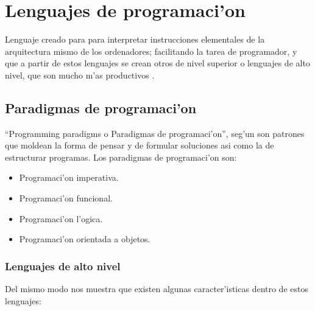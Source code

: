 

\section{Lenguajes de programaci'on}
 
 
Lenguaje creado para para interpretar instrucciones elementales de la arquitectura mismo de los ordenadores; facilitando la tarea de programador, y que a partir de estos lenguajes se crean otros de nivel superior o lenguajes de alto nivel, que son mucho m'as productivos \citep{javier}.

 
\subsection{Paradigmas de programaci'on}

``Programming paradigms o Paradigmas de programaci'on'', seg'un \citet{javier} son patrones que moldean la forma de pensar y de formular soluciones asi como la de estructurar programas. Los paradigmas de programaci'on son: 
\begin{itemize}
\item Programaci'on imperativa. 
\item Programaci'on funcional. 
\item Programaci'on l'ogica. 
\item Programaci'on orientada a objetos.
\end{itemize}

\subsubsection{Lenguajes de alto nivel }
Del mismo modo \citep{javier} nos muestra que existen algunas caracter'isticas dentro de estos lenguajes:

